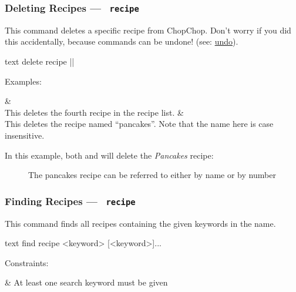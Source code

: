 








\hypertarget{DeleteRecipeCommand}{}
\subsubsection{Deleting Recipes — \texttt{ recipe}}

	This command deletes a specific recipe from ChopChop. Don't worry if you did this accidentally, because commands can be undone!
	(see: \hyperlink{UndoCommand}{undo}).

	 \begin{blockofcode}{text}
		delete recipe |\itemref{}|
	\end{blockofcode}

	Examples:
	\begin{bulletlist}
		&  \\
			This deletes the fourth recipe in the recipe list.
		&  \\
			This deletes the recipe named \enquote{pancakes}. Note that the name here is case insensitive.
	\end{bulletlist}

	In this example, both  and  will delete the \emph{Pancakes} recipe:


	\begin{figure}[!htbp]\centering
		\caption{The pancakes recipe can be referred to either by name or by number}
	\end{figure}



\pagebreak
\hypertarget{FindRecipeCommand}{}
\subsubsection{Finding Recipes — \texttt{ recipe}}

	This command finds all recipes containing the given keywords in the name.

	 \begin{blockofcode}{text}
		find recipe
			<keyword>
			[<keyword>]...
	\end{blockofcode}

	Constraints:
	\begin{romanlist}
		& At least one search keyword must be given
	\end{romanlist}

